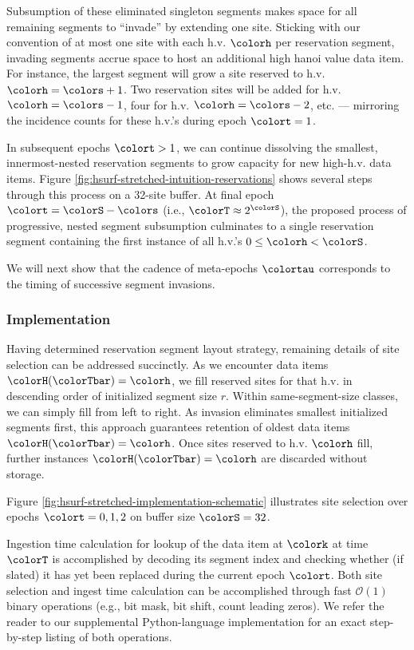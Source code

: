 Subsumption of these eliminated singleton segments makes space for all remaining segments to ``invade'' by extending one site.
Sticking with our convention of at most one site with each h.v. $\colorh$ per reservation segment, invading segments accrue space to host an additional high hanoi value data item.
For instance, the largest segment will grow a site reserved to h.v. $\colorh=\colors +1$.
Two reservation sites will be added for h.v. $\colorh=\colors - 1$, four for h.v. $\colorh=\colors - 2$, etc. --- mirroring the incidence counts for these h.v.'s during epoch $\colort=1$.

In subsequent epochs $\colort>1$, we can continue dissolving the smallest, innermost-nested reservation segments to grow capacity for new high-h.v. data items.
Figure \ref{fig:hsurf-stretched-intuition-reservations} shows several steps through this process on a 32-site buffer.
At final epoch $\colort=\colorS-\colors$ (i.e., $\colorT \approx 2^{\colorS}$), the proposed process of progressive, nested segment subsumption culminates to a single reservation segment containing the first instance of all h.v.'s $0 \leq \colorh < \colorS$.

We will next show that the cadence of meta-epochs $\colortau$ corresponds to the timing of successive segment invasions.



\subsubsection{Implementation}

Having determined reservation segment layout strategy, remaining details of site selection can be addressed succinctly.
As we encounter data items $\colorH(\colorTbar) = \colorh$, we fill reserved sites for that h.v. in descending order of initialized segment size $r$.
Within same-segment-size classes, we can simply fill from left to right.
As invasion eliminates smallest initialized segments first, this approach guarantees retention of oldest data items $\colorH(\colorTbar) = \colorh$.
Once sites reserved to h.v. $\colorh$ fill, further instances $\colorH(\colorTbar) = \colorh$ are discarded without storage.

Figure \ref{fig:hsurf-stretched-implementation-schematic} illustrates site selection over epochs $\colort=0,1,2$ on buffer size $\colorS=32$.

Ingestion time calculation for lookup of the data item at $\colork$ at time $\colorT$ is accomplished by decoding its segment index and checking whether (if slated) it has yet been replaced during the current epoch $\colort$.
Both site selection and ingest time calculation can be accomplished through fast $\mathcal{O}(1)$ binary operations (e.g., bit mask, bit shift, count leading zeros).
We refer the reader to our supplemental Python-language implementation for an exact step-by-step listing of both operations.

